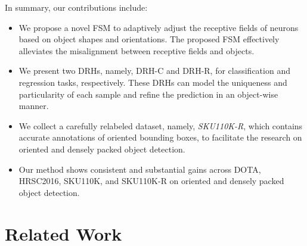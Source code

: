 \documentclass[10pt,twocolumn,letterpaper]{article}
\begin{document}
In summary, our contributions include:
\begin{itemize}
\setlength{\itemsep}{0pt}
\setlength{\parskip}{0pt}
\setlength{\parsep}{0pt}
    \item We propose a novel FSM to adaptively adjust the receptive fields of neurons based on object shapes and orientations. The proposed FSM effectively alleviates the misalignment between receptive fields and objects.
    \item We present two DRHs, namely, DRH-C and DRH-R, for classification and regression tasks, respectively. These DRHs can model the uniqueness and particularity of each sample and refine the prediction in an object-wise manner.
    \item We collect a carefully relabeled dataset, namely, \emph{SKU110K-R}, which contains accurate annotations of oriented bounding boxes, to facilitate the research on oriented and densely packed object detection.
    \item Our method shows consistent and substantial gains across DOTA, HRSC2016, SKU110K, and SKU110K-R on oriented and densely packed object detection.
\end{itemize}

\section{Related Work}
\label{sec:rw}
\end{document}
